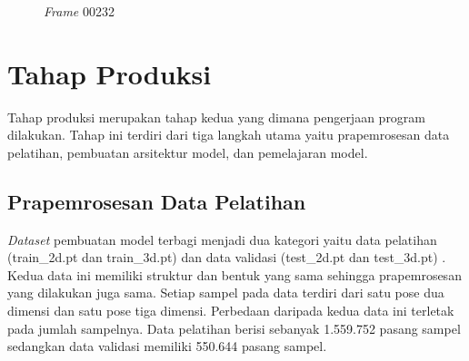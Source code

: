\begin{figure}[htbp]
    \begin{center}
    \end{center}
    \vspace{-20pt}
    \captionsetup{labelfont=bf, textfont=bf}
    \caption{\textit{Frame} 00232}
    \vspace{-10pt}
    \captionsetup{labelfont=md, textfont=md}
    \label{fig:frame00232}
\end{figure}

\section{Tahap Produksi} \label{sec:3-TahapProduksi}

Tahap produksi merupakan tahap kedua yang dimana pengerjaan program dilakukan. Tahap ini terdiri dari
tiga langkah utama yaitu prapemrosesan data pelatihan, pembuatan arsitektur model, dan pemelajaran model.


\subsection{Prapemrosesan Data Pelatihan}

\textit{Dataset} pembuatan model terbagi menjadi dua kategori yaitu data pelatihan
(train\_2d.pt dan train\_3d.pt) dan data validasi (test\_2d.pt dan test\_3d.pt) .
Kedua data ini memiliki struktur dan bentuk yang sama sehingga prapemrosesan yang dilakukan juga sama.
Setiap sampel pada data terdiri dari satu pose dua dimensi dan satu pose tiga dimensi.
Perbedaan daripada kedua data ini terletak pada jumlah sampelnya. Data pelatihan berisi sebanyak
1.559.752 pasang sampel sedangkan data validasi memiliki 550.644 pasang sampel.

